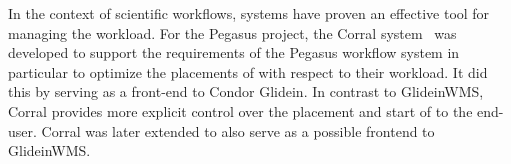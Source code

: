 \documentclass{sig-alternate}
\begin{document}

In the context of scientific workflows, \pilotjob systems have proven an
effective tool for managing the workload. For the Pegasus project, the Corral
system~\cite{Rynge:2011:EUG:2116259.2116599} was developed to support the
requirements of the Pegasus workflow system in particular to optimize the
placements of \pilots with respect to their workload. It did this by serving as
a front-end to Condor Glidein. In contrast to GlideinWMS, Corral provides more
explicit control over the placement and start of \pilots to the end-user.
Corral was later extended to also serve as a possible frontend to GlideinWMS.
\end{document}
